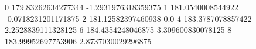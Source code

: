0 179.83262634277344 -1.2931976318359375
1 181.0540008544922 -0.0718231201171875
2 181.12582397460938 0.0
4 183.3787078857422 2.2528839111328125
6 184.4354248046875 3.309600830078125
8 183.99952697753906 2.8737030029296875
